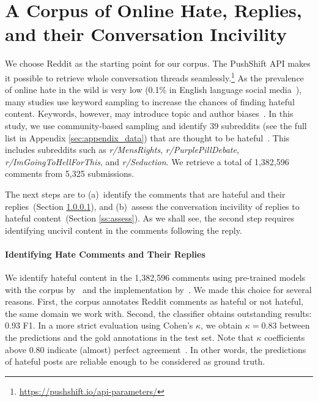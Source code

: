 \documentclass[11pt]{article}
\begin{document}
	
	\section{A Corpus of Online Hate, Replies, and their Conversation Incivility}
	\label{s:corpus}
	We choose Reddit as the starting point for our corpus.
	The PushShift API makes it possible to retrieve whole conversation threads seamlessly.\footnote{\url{https://pushshift.io/api-parameters/}}
	As the prevalence of online hate in the wild is very low (0.1\% in English language social media~\cite{vidgen-etal-2019-challenges}), many studies use keyword sampling to increase the chances of finding hateful content. 
	Keywords, however, may introduce topic and author biases~\cite{wiegand-etal-2019-detection,vidgen-etal-2021-introducing}. 
	In this study, we use community-based sampling and identify
	39 subreddits (see the full list in Appendix \ref{sec:appendix_data}) that are thought to be hateful~\cite{qian-etal-2019-benchmark,guest-etal-2021-expert,vidgen-etal-2021-introducing}. 
	This includes subreddits such as \textit{r/MensRights},  \textit{r/PurplePillDebate}, \textit{r/ImGoingToHellForThis}, and \textit{r/Seduction}.
	We retrieve a total of 1,382,596 comments from 5,325 submissions.
	
	The next steps are to 
	(a)~identify the comments that are hateful and their replies~(Section \ref{ss:identify}),
	and
	(b)~assess the conversation incivility of replies to hateful content~(Section \ref{ss:assess}).
	As we shall see, the second step requires identifying uncivil content in the comments following the reply.
	
	\paragraph{Identifying Hate Comments and Their Replies}
	\label{ss:identify}
	We identify hateful content in the 1,382,596 comments using pre-trained models \cite{DBLP:journals/corr/abs-1907-11692} with the corpus by~\citet{qian-etal-2019-benchmark}
	and
	the implementation by~\citet{phang2020jiant}.
	We made this choice for several reasons.
	First, the corpus annotates Reddit comments as hateful or not hateful, the same domain we work with.
	Second, the classifier obtains outstanding results: 0.93 F1.
	In a more strict evaluation using Cohen's $\kappa$, we obtain $\kappa=0.83$ between the predictions and the gold annotations in the test set.
	Note that $\kappa$ coefficients above $0.80$ indicate (almost) perfect agreement~\cite{artstein2008inter}.
	In other words, the predictions of hateful posts are reliable enough to be considered as ground truth.
	
\end{document}
